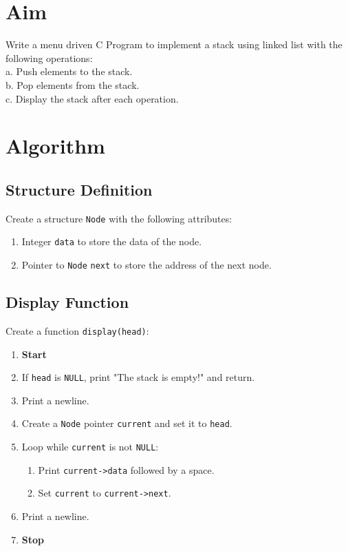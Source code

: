 
\section{Aim}
Write a menu driven C Program to implement a stack using linked list with the following
operations:
\\a. Push elements to the stack.
\\b. Pop elements from the stack.
\\c. Display the stack after each operation.

\section{Algorithm}
 {\selectfont

  \subsection{Structure Definition}
  Create a structure \texttt{Node} with the following attributes:
  \begin{enumerate}[label=\arabic*:,left=0pt]
    \item Integer \texttt{data} to store the data of the node.
    \item Pointer to \texttt{Node} \texttt{next} to store the address of the next node.
  \end{enumerate}

  \subsection{Display Function}
  Create a function \texttt{display(head)}:
  \begin{enumerate}[label=\arabic*:,left=0pt]
    \item \textbf{Start}
    \item If \texttt{head} is \texttt{NULL}, print "The stack is empty!" and return.
    \item Print a newline.
    \item Create a \texttt{Node} pointer \texttt{current} and set it to \texttt{head}.
    \item Loop while \texttt{current} is not \texttt{NULL}:
          \begin{enumerate}[label=2.\arabic*:, start=1]
            \item Print \texttt{current->data} followed by a space.
            \item Set \texttt{current} to \texttt{current->next}.
          \end{enumerate}
    \item Print a newline.
    \item \textbf{Stop}
  \end{enumerate}

}
